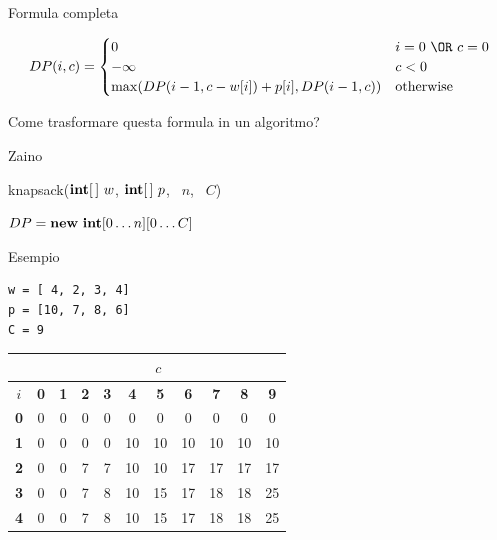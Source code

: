 \begin{frame}{Formula completa}

\begingroup
\small
\[
DP(i,c) = \begin{cases}
  0 & i=0\ \OR\ c=0 \\
  -\infty & c < 0 \\
  \max( DP(i-1,c-w[i]) + p[i], DP(i-1,c) ) & \textrm{otherwise}
\end{cases}
\]
\endgroup

Come trasformare questa formula in un algoritmo?

\end{frame}

\begin{frame}{Zaino}

\vspace{-12pt}
\begin{Procedure}
\caption[A]{\textsf{knapsack}($\INTEGER[\,]\ w$, $\INTEGER[\,]\ p$, \INTEGER\ $n$, \INTEGER\ $C$)}

$DP = \NEW\ \INTEGER[0 \ldots n][0 \ldots C]$\;
\end{Procedure}

\end{frame}


\begin{frame}[fragile]{Esempio}

\begin{lstlisting}
w = [ 4, 2, 3, 4]
p = [10, 7, 8, 6]
C = 9  
\end{lstlisting}

\bigskip
\begin{tabular}{|c|c|c|c|c|c|c|c|c|c|c|}
\hline
& \multicolumn{10}{c|}{$c$} \\\hline
$i$ & \textbf{0} & \textbf{1} & \textbf{2} & \textbf{3} & \textbf{4} & \textbf{5} & \textbf{6} & \textbf{7} & \textbf{8} & \textbf{9}  \\\hline
\textbf{0} & 0 &  0 &  0 &  0 &  0 &  0 &  0 &  0 &  0 &  0 \\\hline
\textbf{1} & 0 &  0 &  0 &  0 & 10 & 10 & 10 & 10 & 10 & 10 \\\hline
\textbf{2} & 0 &  0 &  7 &  7 & 10 & 10 & 17 & 17 & 17 & 17 \\\hline
\textbf{3} & 0 &  0 &  7 &  8 & 10 & 15 & 17 & 18 & 18 & 25 \\\hline
\textbf{4} & 0 &  0 &  7 &  8 & 10 & 15 & 17 & 18 & 18 & 25 \\\hline  
\end{tabular}  

\end{frame}

